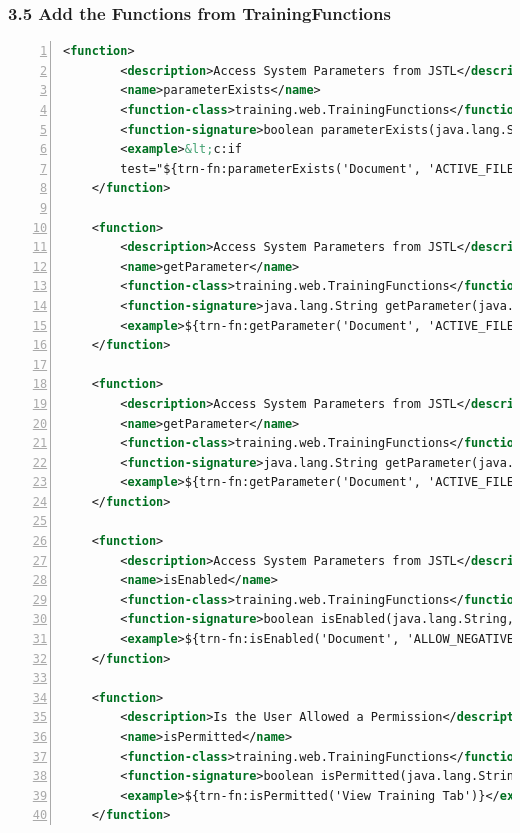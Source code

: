 \subsubsection*{3.5 Add the Functions from TrainingFunctions}
\begin{lstlisting}[basicstyle=\scriptsize,numbers=left,language=xml,backgroundcolor=\color{ubergray},caption={src/main/webapp/WEB-INF/tlds/trnfunc.tld
  Tag Library Definition},frame=single,breaklines=true]
    <function>
        <description>Access System Parameters from JSTL</description>
        <name>parameterExists</name>
        <function-class>training.web.TrainingFunctions</function-class>
        <function-signature>boolean parameterExists(java.lang.String, java.lang.String)</function-signature>
        <example>&lt;c:if
        test="${trn-fn:parameterExists('Document', 'ACTIVE_FILE_TYPES')}"&gt;&lt;/c:if&gt;</example>
    </function>

    <function>
        <description>Access System Parameters from JSTL</description>
        <name>getParameter</name>
        <function-class>training.web.TrainingFunctions</function-class>
        <function-signature>java.lang.String getParameter(java.lang.String, java.lang.String)</function-signature>
        <example>${trn-fn:getParameter('Document', 'ACTIVE_FILE_TYPES')}</example>
    </function>

    <function>
        <description>Access System Parameters from JSTL</description>
        <name>getParameter</name>
        <function-class>training.web.TrainingFunctions</function-class>
        <function-signature>java.lang.String getParameter(java.lang.String, java.lang.String)</function-signature>
        <example>${trn-fn:getParameter('Document', 'ACTIVE_FILE_TYPES')}</example>
    </function>

    <function>
        <description>Access System Parameters from JSTL</description>
        <name>isEnabled</name>
        <function-class>training.web.TrainingFunctions</function-class>
        <function-signature>boolean isEnabled(java.lang.String, java.lang.String)</function-signature>
        <example>${trn-fn:isEnabled('Document', 'ALLOW_NEGATIVE_BALANCE_IND')}</example>
    </function>

    <function>
        <description>Is the User Allowed a Permission</description>
        <name>isPermitted</name>
        <function-class>training.web.TrainingFunctions</function-class>
        <function-signature>boolean isPermitted(java.lang.String, java.lang.String)</function-signature>
        <example>${trn-fn:isPermitted('View Training Tab')}</example>
    </function>
\end{lstlisting}

